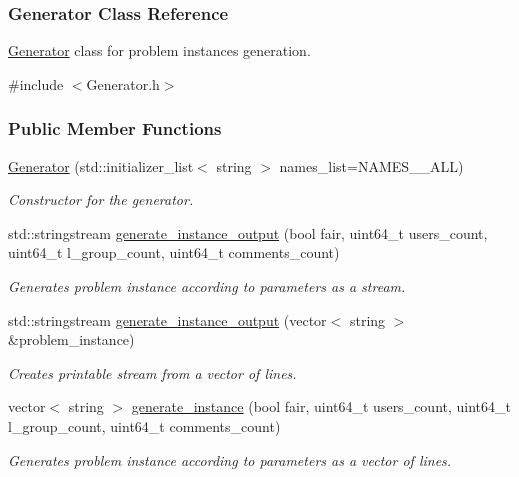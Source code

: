 \hypertarget{classGenerator}{}\subsubsection{Generator Class Reference}
\label{classGenerator}

\hyperlink{classGenerator}{Generator} class for problem instances generation.  

{\ttfamily \#include $<$Generator.\+h$>$}

\subsubsection*{Public Member Functions}
\begin{DoxyCompactItemize}
\item 
\hyperlink{classGenerator_a1ce5bb44188a5462036c68bf015ae0d8}{Generator} (std\+::initializer\+\_\+list$<$ string $>$ names\+\_\+list=N\+A\+M\+E\+S\+\_\+\+\_\+\+A\+LL)
\begin{DoxyCompactList}\small\item\em Constructor for the generator. \end{DoxyCompactList}\item 
std\+::stringstream \hyperlink{classGenerator_a2873be94ef5a7ee92c64bf01dc42bd98}{generate\+\_\+instance\+\_\+output} (bool fair, uint64\+\_\+t users\+\_\+count, uint64\+\_\+t l\+\_\+group\+\_\+count, uint64\+\_\+t comments\+\_\+count)
\begin{DoxyCompactList}\small\item\em Generates problem instance according to parameters as a stream. \end{DoxyCompactList}\item 
std\+::stringstream \hyperlink{classGenerator_a539c68811602cc9ac9db58ff129249b8}{generate\+\_\+instance\+\_\+output} (vector$<$ string $>$ \&problem\+\_\+instance)
\begin{DoxyCompactList}\small\item\em Creates printable stream from a vector of lines. \end{DoxyCompactList}\item 
vector$<$ string $>$ \hyperlink{classGenerator_a60599c686935e3e60e9c553b09890d2c}{generate\+\_\+instance} (bool fair, uint64\+\_\+t users\+\_\+count, uint64\+\_\+t l\+\_\+group\+\_\+count, uint64\+\_\+t comments\+\_\+count)
\begin{DoxyCompactList}\small\item\em Generates problem instance according to parameters as a vector of lines. \end{DoxyCompactList}\end{DoxyCompactItemize}

